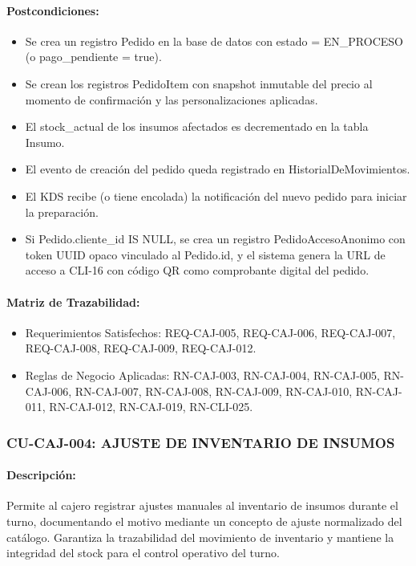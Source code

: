 \paragraph{Postcondiciones:}
\begin{itemize}
    \item Se crea un registro Pedido en la base de datos con estado = EN\_PROCESO (o pago\_pendiente = true).
    \item Se crean los registros PedidoItem con snapshot inmutable del precio al momento de confirmación y las personalizaciones aplicadas.
    \item El stock\_actual de los insumos afectados es decrementado en la tabla Insumo.
    \item El evento de creación del pedido queda registrado en HistorialDeMovimientos.
    \item El KDS recibe (o tiene encolada) la notificación del nuevo pedido para iniciar la preparación.
    \item Si Pedido.cliente\_id IS NULL, se crea un registro PedidoAccesoAnonimo con token UUID opaco vinculado al Pedido.id, y el sistema genera la URL de acceso a CLI-16 con código QR como comprobante digital del pedido.
\end{itemize}

\paragraph{Matriz de Trazabilidad:}
\begin{itemize}
    \item Requerimientos Satisfechos: REQ-CAJ-005, REQ-CAJ-006, REQ-CAJ-007, REQ-CAJ-008, REQ-CAJ-009, REQ-CAJ-012.
    \item Reglas de Negocio Aplicadas: RN-CAJ-003, RN-CAJ-004, RN-CAJ-005, RN-CAJ-006, RN-CAJ-007, RN-CAJ-008, RN-CAJ-009, RN-CAJ-010, RN-CAJ-011, RN-CAJ-012, RN-CAJ-019, RN-CLI-025.
\end{itemize}

\subsubsection{CU-CAJ-004: AJUSTE DE INVENTARIO DE INSUMOS}
\paragraph{Descripción:} Permite al cajero registrar ajustes manuales al inventario de insumos durante el turno, documentando el motivo mediante un concepto de ajuste normalizado del catálogo. Garantiza la trazabilidad del movimiento de inventario y mantiene la integridad del stock para el control operativo del turno.

